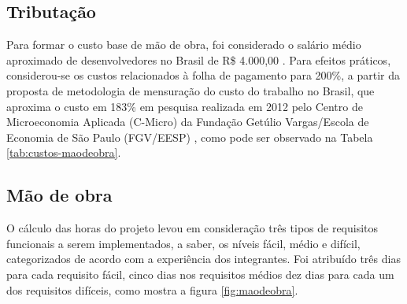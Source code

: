 \documentclass[
    12pt,               %
    openright,          %
    oneside,
    a4paper,            %
    BIBLATEX,           %
    TODO,               %
    english,            %
    brazil              %
    ]{ifsp-spo-inf-ctds}
\begin{document}
        \subsection{Tributação}
        

            Para formar o custo base de mão de obra, foi considerado o salário médio aproximado de desenvolvedores no Brasil de R\$ 4.000,00  . Para efeitos práticos, considerou-se os custos relacionados à folha de pagamento para 200\%, a partir da proposta de metodologia de mensuração do custo do trabalho no Brasil, que aproxima o custo em 183\% em pesquisa realizada em 2012 pelo Centro de Microeconomia Aplicada (C-Micro) da Fundação Getúlio Vargas/Escola de Economia de São Paulo (FGV/EESP) , como pode ser observado na Tabela \ref{tab:custos-maodeobra}.


        \subsection{Mão de obra}
        

            
            O cálculo das horas do projeto levou em consideração três tipos de requisitos funcionais a serem implementados, a saber, os níveis fácil, médio e difícil, categorizados de acordo com a experiência dos integrantes. Foi atribuído três dias para cada requisito fácil, cinco dias nos requisitos médios  dez dias para cada um dos requisitos difíceis, como mostra a figura 
            \ref{fig:maodeobra}.
\end{document}
